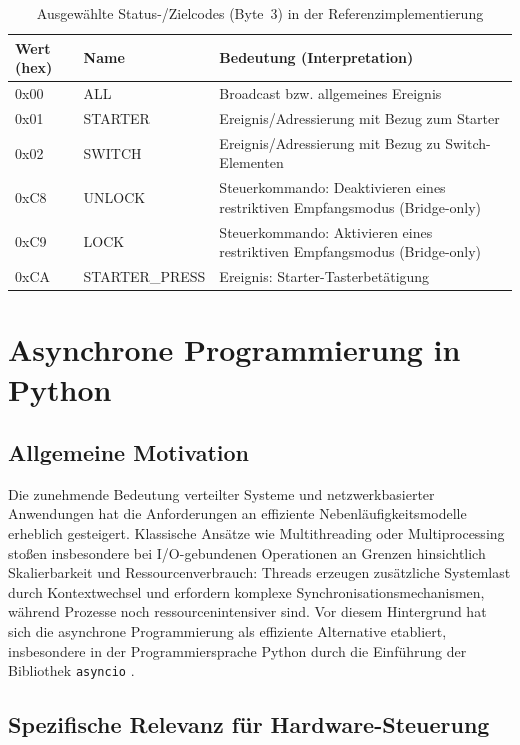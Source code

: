 \begin{table}[ht]
\centering
\begin{tabularx}{\textwidth}{@{}l l X@{}}
\toprule
\textbf{Wert (hex)} & \textbf{Name} & \textbf{Bedeutung (Interpretation)} \\
\midrule
0x00 & ALL & Broadcast bzw. allgemeines Ereignis \\
0x01 & STARTER & Ereignis/Adressierung mit Bezug zum Starter \\
0x02 & SWITCH & Ereignis/Adressierung mit Bezug zu Switch-Elementen \\
0xC8 & UNLOCK & Steuerkommando: Deaktivieren eines restriktiven Empfangsmodus (Bridge-only) \\
0xC9 & LOCK & Steuerkommando: Aktivieren eines restriktiven Empfangsmodus (Bridge-only) \\
0xCA & STARTER\_PRESS & Ereignis: Starter-Tasterbetätigung \\
\bottomrule
\end{tabularx}
\caption{Ausgewählte Status-/Zielcodes (Byte~3) in der Referenzimplementierung}
\label{tab:gt-statuscodes}
\end{table}

\section{Asynchrone Programmierung in Python}

\subsection{Allgemeine Motivation}

Die zunehmende Bedeutung verteilter Systeme und netzwerkbasierter Anwendungen hat die Anforderungen an effiziente Nebenläufigkeitsmodelle erheblich gesteigert.
Klassische Ansätze wie Multithreading oder Multiprocessing stoßen insbesondere bei I/O-gebundenen Operationen an Grenzen hinsichtlich Skalierbarkeit und Ressourcenverbrauch: Threads erzeugen zusätzliche Systemlast durch Kontextwechsel und erfordern komplexe Synchronisationsmechanismen, während Prozesse noch ressourcenintensiver sind.
Vor diesem Hintergrund hat sich die asynchrone Programmierung als effiziente Alternative etabliert, insbesondere in der Programmiersprache Python durch die Einführung der Bibliothek \texttt{asyncio} \cite{hattingh2020}.

\subsection{Spezifische Relevanz für Hardware-Steuerung}

